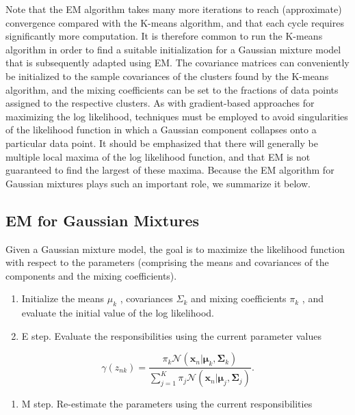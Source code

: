\documentclass[
  10
]{article}
\providecommand{\tightlist}{%
  \setlength{\itemsep}{0pt}\setlength{\parskip}{0pt}}
\begin{document}
Note that the EM algorithm takes many more iterations to reach
(approximate) convergence compared with the K-means algorithm, and that
each cycle requires significantly more computation. It is therefore
common to run the K-means algorithm in order to find a suitable
initialization for a Gaussian mixture model that is subsequently adapted
using EM. The covariance matrices can conveniently be initialized to the
sample covariances of the clusters found by the K-means algorithm, and
the mixing coefficients can be set to the fractions of data points
assigned to the respective clusters. As with gradient-based approaches
for maximizing the log likelihood, techniques must be employed to avoid
singularities of the likelihood function in which a Gaussian component
collapses onto a particular data point. It should be emphasized that
there will generally be multiple local maxima of the log likelihood
function, and that EM is not guaranteed to find the largest of these
maxima. Because the EM algorithm for Gaussian mixtures plays such an
important role, we summarize it below.

\subsection{EM for Gaussian Mixtures}\label{em-for-gaussian-mixtures-1}

Given a Gaussian mixture model, the goal is to maximize the likelihood
function with respect to the parameters (comprising the means and
covariances of the components and the mixing coefficients).

\begin{enumerate}
\def\labelenumi{\arabic{enumi}.}
\item
  Initialize the means \(\mu _ { k }\) , covariances \(\Sigma _ { k }\)
  and mixing coefficients \(\pi _ { k }\) , and evaluate the initial
  value of the log likelihood.
\item
  E step. Evaluate the responsibilities using the current parameter
  values
\end{enumerate}

\[
\gamma (z _ {n k}) = \frac {\pi_ {k} \mathcal {N} (\mathbf {x} _ {n} | \boldsymbol {\mu} _ {k} , \boldsymbol {\Sigma} _ {k})}{\sum_ {j = 1} ^ {K} \pi_ {j} \mathcal {N} (\mathbf {x} _ {n} | \boldsymbol {\mu} _ {j} , \boldsymbol {\Sigma} _ {j})}.\tag{9.23}
\]

\begin{enumerate}
\def\labelenumi{\arabic{enumi}.}
\setcounter{enumi}{2}
\tightlist
\item
  M step. Re-estimate the parameters using the current responsibilities
\end{enumerate}
\end{document}
